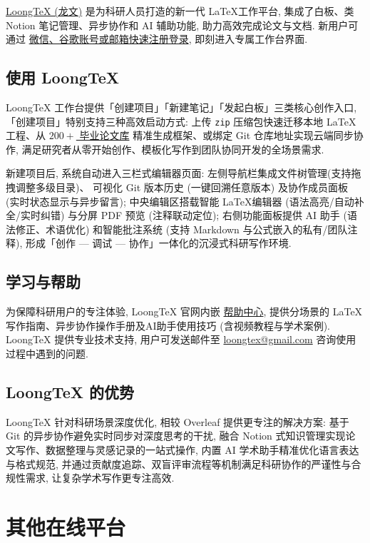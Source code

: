 \href{https://www.loongtex.com}{LoongTeX (龙文)}
是为科研人员打造的新一代 \LaTeX 工作平台,
集成了白板、类 Notion 笔记管理、异步协作和 AI 辅助功能, 助力高效完成论文与文档.
新用户可通过%
\href{https://app.loongtex.com/user/login}{微信、谷歌账号或邮箱快速注册登录},
即刻进入专属工作台界面.

\subsection{使用 LoongTeX}

LoongTeX 工作台提供「创建项目」「新建笔记」「发起白板」三类核心创作入口,
「创建项目」特别支持三种高效启动方式: 上传 \texttt{zip} 压缩包快速迁移本地 \LaTeX 工程、从 \href{https://www.loongtex.com/templates}{$200+$ 毕业论文库}%
精准生成框架、或绑定 Git 仓库地址实现云端同步协作,
满足研究者从零开始创作、模板化写作到团队协同开发的全场景需求.

新建项目后, 系统自动进入三栏式编辑器页面: 左侧导航栏集成文件树管理(支持拖拽调整多级目录)、
可视化 Git 版本历史 (一键回溯任意版本) 及协作成员面板 (实时状态显示与异步留言);
中央编辑区搭载智能 \LaTeX 编辑器 (语法高亮/自动补全/实时纠错)
与分屏 PDF 预览 (注释联动定位);
右侧功能面板提供 AI 助手 (语法修正、术语优化)
和智能批注系统 (支持 Markdown 与公式嵌入的私有/团队注释),
形成「创作 --- 调试 --- 协作」一体化的沉浸式科研写作环境.

\subsection{学习与帮助}

为保障科研用户的专注体验, LoongTeX 官网内嵌%
\href{https://www.loongtex.com/docs/app/help}{帮助中心},
提供分场景的 \LaTeX 写作指南、异步协作操作手册及AI助手使用技巧 (含视频教程与学术案例).
LoongTeX 提供专业技术支持, 用户可发送邮件至
\href{mailto:loongtex@gmail.com}{\ttfamily loongtex@gmail.com}
咨询使用过程中遇到的问题.

\subsection{LoongTeX 的优势}

LoongTeX 针对科研场景深度优化, 相较 Overleaf 提供更专注的解决方案:
基于 Git 的异步协作避免实时同步对深度思考的干扰,
融合 Notion 式知识管理实现论文写作、数据整理与灵感记录的一站式操作,
内置 AI 学术助手精准优化语言表达与格式规范,
并通过贡献度追踪、双盲评审流程等机制满足科研协作的严谨性与合规性需求,
让复杂学术写作更专注高效.

\section{其他在线平台}

